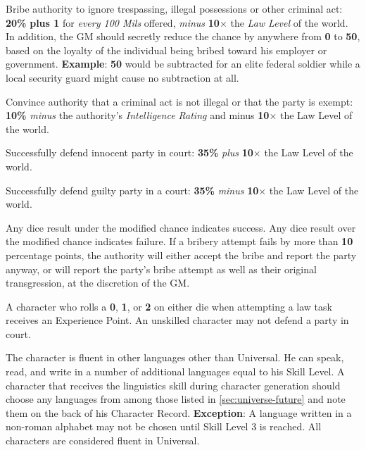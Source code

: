 \begin{tasklist}
\item Bribe authority to ignore trespassing, illegal possessions or
  other criminal act: \textbf{20\%} \textbf{plus 1} for \emph{every
    100 Mils} offered, \emph{minus} \textbf{10$\times$} the 
  \emph{Law Level} of the world.  In addition, the GM should secretly
  reduce the chance by anywhere from \textbf{0} to \textbf{50}, based
  on the loyalty of the individual being bribed toward his employer or
  government.  \textbf{Example}: \textbf{50} would be subtracted for
  an elite federal soldier while a local security guard might cause no
  subtraction at all.
\item Convince authority that a criminal act is not illegal or that
  the party is exempt: \textbf{10\%} \emph{minus} the authority's
  \emph{Intelligence Rating} and minus \textbf{10$\times$} the Law
  Level of the world.
\item Successfully defend innocent party in court: \textbf{35\%}
  \emph{plus} \textbf{10$\times$} the Law Level of the world.
\item Successfully defend guilty party in a court: \textbf{35\%}
  \emph{minus} \textbf{10$\times$} the Law Level of the world.
\end{tasklist}

Any dice result under the modified chance indicates success.  Any dice
result over the modified chance indicates failure.  If a bribery
attempt fails by more than \textbf{10} percentage points, the
authority will either accept the bribe and report the party anyway, or
will report the party's bribe attempt as well as their original
transgression, at the discretion of the GM.

A character who rolls a \textbf{0}, \textbf{1}, or \textbf{2} on
either die when attempting a law task receives an Experience Point.  An
unskilled character may not defend a party in court.

\label{sec:skill-linguistics}

The character is fluent in other languages other than Universal.  He
can speak, read, and write in a number of additional languages equal
to his Skill Level.  A character that receives the linguistics skill
during character generation should choose any languages from among
those listed in \ref{sec:universe-future} and note them on the back of his
Character Record.  \textbf{Exception}: A language written in a
non-roman alphabet may not be chosen until Skill Level 3 is reached.
All characters are considered fluent in Universal.

